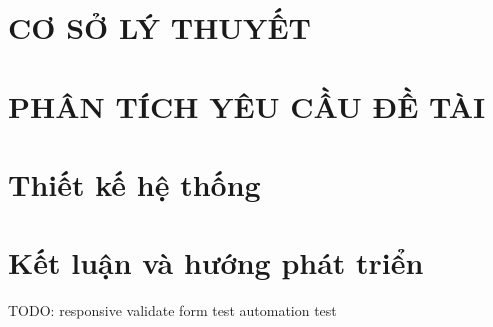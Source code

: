 \documentclass[12pt, a4paper]{report}
\begin{document}
\chapter{\textbf{CƠ SỞ LÝ THUYẾT}}
\newpage

\newpage
\chapter{\textbf{PHÂN TÍCH YÊU CẦU ĐỀ TÀI}}
\newpage

\newpage
\chapter{\textbf{Thiết kế hệ thống}}
\newpage

\newpage
\chapter{\textbf{Kết luận và hướng phát triển}}
\newpage



TODO: responsive
validate form
test
automation test
\end{document}
